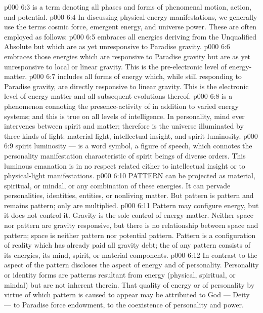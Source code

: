 \vs p000 6:3 \pc {} is a term denoting all phases and forms of phenomenal motion, action, and potential.
\vs p000 6:4 In discussing physical\hyp{}energy manifestations, we generally use the terms cosmic force, emergent energy, and universe power. These are often employed as follows:
\vs p000 6:5 \bibnobreakspace {} embraces all energies deriving from the Unqualified Absolute but which are as yet unresponsive to Paradise gravity.
\vs p000 6:6 \bibnobreakspace {} embraces those energies which are responsive to Paradise gravity but are as yet unresponsive to local or linear gravity. This is the pre\hyp{}electronic level of energy\hyp{}matter.
\vs p000 6:7 \bibnobreakspace {} includes all forms of energy which, while still responding to Paradise gravity, are directly responsive to linear gravity. This is the electronic level of energy\hyp{}matter and all subsequent evolutions thereof.
\vs p000 6:8 \pc {} is a phenomenon connoting the presence\hyp{}activity of  in addition to varied energy systems; and this is true on all levels of intelligence. In personality, mind ever intervenes between spirit and matter; therefore is the universe illuminated by three kinds of light: material light, intellectual insight, and spirit luminosity.
\vs p000 6:9 \pc {} spirit luminosity --- is a word symbol, a figure of speech, which connotes the personality manifestation characteristic of spirit beings of diverse orders. This luminous emanation is in no respect related either to intellectual insight or to physical\hyp{}light manifestations.
\vs p000 6:10 \pc PATTERN can be projected as material, spiritual, or mindal, or any combination of these energies. It can pervade personalities, identities, entities, or nonliving matter. But pattern is pattern and remains pattern; only  are multiplied.
\vs p000 6:11 Pattern may configure energy, but it does not control it. Gravity is the sole control of energy\hyp{}matter. Neither space nor pattern are gravity responsive, but there is no relationship between space and pattern; space is neither pattern nor potential pattern. Pattern is a configuration of reality which has already paid all gravity debt; the  of any pattern consists of its energies, its mind, spirit, or material components.
\vs p000 6:12 In contrast to the aspect of the  pattern discloses the  aspect of energy and of personality. Personality or identity forms are patterns resultant from energy (physical, spiritual, or mindal) but are not inherent therein. That quality of energy or of personality by virtue of which pattern is caused to appear may be attributed to God --- Deity --- to Paradise force endowment, to the coexistence of personality and power.
